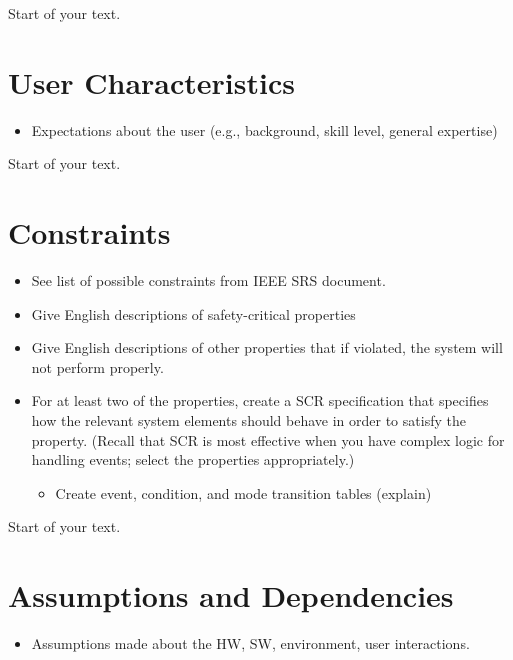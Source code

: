 \documentclass[12pt]{article}
\begin{document}
Start of your text.

\section{User Characteristics}\label{user-characteristics}

\begin{itemize}
\item
  Expectations about the user (e.g., background, skill level, general
  expertise)
\end{itemize}

Start of your text.

\section{Constraints}\label{constraints}

\begin{itemize}
\item
  See list of possible constraints from IEEE SRS document.
\item
  Give English descriptions of safety-critical properties
\item
  Give English descriptions of other properties that if violated, the
  system will not perform properly.
\item
  For at least two of the properties, create a SCR specification that
  specifies how the relevant system elements should behave in order to
  satisfy the property. (Recall that SCR is most effective when you have
  complex logic for handling events; select the properties
  appropriately.)

  \begin{itemize}
  \item
    Create event, condition, and mode transition tables (explain)
  \end{itemize}
\end{itemize}

Start of your text.

\section{Assumptions and
Dependencies}\label{assumptions-and-dependencies}

\begin{itemize}
\item
  Assumptions made about the HW, SW, environment, user interactions.
\end{itemize}
\end{document}
